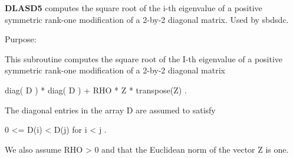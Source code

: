 {\bfseries D\+L\+A\+S\+D5} computes the square root of the i-\/th eigenvalue of a positive symmetric rank-\/one modification of a 2-\/by-\/2 diagonal matrix. Used by sbdsdc. 

 \begin{DoxyParagraph}{Purpose\+: }
\begin{DoxyVerb} This subroutine computes the square root of the I-th eigenvalue
 of a positive symmetric rank-one modification of a 2-by-2 diagonal
 matrix

            diag( D ) * diag( D ) +  RHO * Z * transpose(Z) .

 The diagonal entries in the array D are assumed to satisfy

            0 <= D(i) < D(j)  for  i < j .

 We also assume RHO > 0 and that the Euclidean norm of the vector
 Z is one.\end{DoxyVerb}
 
\end{DoxyParagraph}

